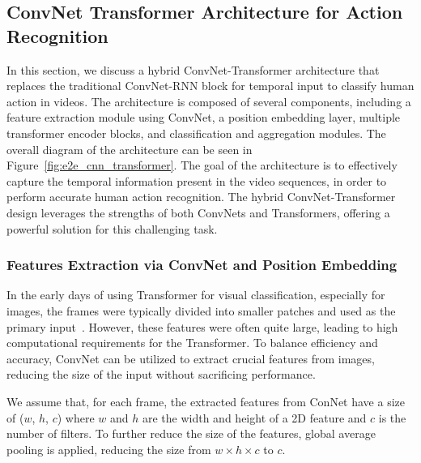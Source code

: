 \documentclass[fleqn,10pt]{wlscirep}
\begin{document}
\subsection{ConvNet Transformer Architecture for Action Recognition}
\label{sec:cotrar}
In this section, we discuss a hybrid ConvNet-Transformer architecture that replaces the traditional ConvNet-RNN block for temporal input to classify human action in videos. 
The architecture is composed of several components, including a feature extraction module using ConvNet, a position embedding layer, multiple transformer encoder blocks, and classification and aggregation modules. The overall diagram of the architecture can be seen in Figure~\ref{fig:e2e_cnn_transformer}. The goal of the architecture is to effectively capture the temporal information present in the video sequences, in order to perform accurate human action recognition. The hybrid ConvNet-Transformer design leverages the strengths of both ConvNets and Transformers, offering a powerful solution for this challenging task.
\subsubsection{Features Extraction via ConvNet and Position Embedding} 
In the early days of using Transformer for visual classification, especially for images, the frames were typically divided into smaller patches and used as the primary input~\cite{liu2022video,liu2021swin,zhang2021vidtr}. However, these features were often quite large, leading to high computational requirements for the Transformer. To balance efficiency and accuracy, ConvNet can be utilized to extract crucial features from images, reducing the size of the input without sacrificing performance.

We assume that, for each frame, the extracted features from ConNet have a size of ($w$, $h$, $c$) where $w$ and $h$ are the width and height of a 2D feature and $c$ is the number of filters. To further reduce the size of the features, global average pooling is applied, reducing the size from $w \times h \times c$ to $c$.
\end{document}
